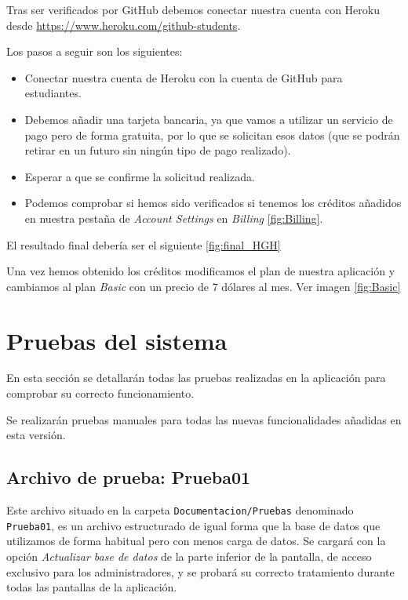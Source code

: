 


Tras ser verificados por GitHub debemos conectar nuestra cuenta con Heroku desde \href{https://www.heroku.com/github-students}{https://www.heroku.com/github-students}.

Los pasos a seguir son los siguientes:
\begin{itemize}
	\item Conectar nuestra cuenta de Heroku con la cuenta de GitHub para estudiantes.
	\item Debemos añadir una tarjeta bancaria, ya que vamos a utilizar un servicio de pago pero de forma gratuita, por lo que se solicitan esos datos (que se podrán retirar en un futuro sin ningún tipo de pago realizado).
	\item Esperar a que se confirme la solicitud realizada.
	\item Podemos comprobar si hemos sido verificados si tenemos los créditos añadidos en nuestra pestaña de \emph{Account Settings} en \emph{Billing} \ref{fig:Billing}.
\end{itemize}
El resultado final debería ser el siguiente \ref{fig:final_HGH}


Una vez hemos obtenido los créditos modificamos el plan de nuestra aplicación y cambiamos al plan \emph{Basic} con un precio de 7 dólares al mes. Ver imagen \ref{fig:Basic}


\section{Pruebas del sistema}

En esta sección se detallarán todas las pruebas realizadas en la aplicación para comprobar su correcto funcionamiento.

Se realizarán pruebas manuales para todas las nuevas funcionalidades añadidas en esta versión.

\subsection{Archivo de prueba: Prueba01}
Este archivo situado en la carpeta \texttt{Documentacion/Pruebas} denominado \texttt{Prueba01}, es un archivo estructurado de igual forma que la base de datos que utilizamos de forma habitual pero con menos carga de datos.
Se cargará con la opción \emph{Actualizar base de datos} de la parte inferior de la pantalla, de acceso exclusivo para los administradores, y se probará su correcto tratamiento durante todas las pantallas de la aplicación.

